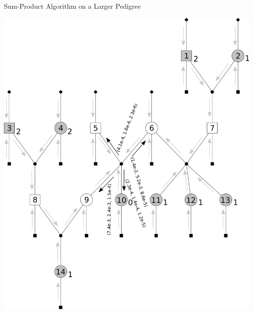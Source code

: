 \documentclass[letter,graphicx]{beamer}
\begin{document}
\begin{frame}{Sum-Product Algorithm on a Larger Pedigree} 
\begin{center} 
\includegraphics[height = 0.8\textheight]{./images/mg-example-step7.pdf} 
\end{center}
\end{frame}
\end{document}
